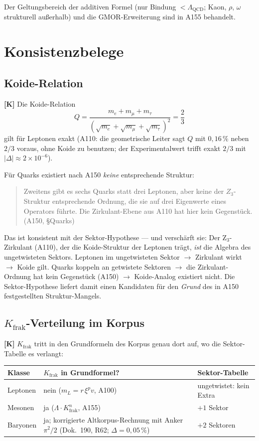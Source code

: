 Der Geltungsbereich der additiven Formel (nur Bindung
$< \Lambda_\text{QCD}$; Kaon, $\rho$, $\omega$ strukturell außerhalb)
und die GMOR-Erweiterung sind in A155 behandelt.

\section{Konsistenzbelege}

\subsection{Koide-Relation}

\textbf{[K]} Die Koide-Relation
\[
  Q = \frac{m_e+m_\mu+m_\tau}{(\sqrt{m_e}+\sqrt{m_\mu}+\sqrt{m_\tau})^2}
  = \frac{2}{3}
\]
gilt für Leptonen exakt (A110: die geometrische Leiter sagt $Q$ mit
$0{,}16\,\%$ neben $2/3$ voraus, ohne Koide zu benutzen; der
Experimentalwert trifft exakt $2/3$ mit $|\Delta| \approx 2\times10^{-6}$).

Für Quarks existiert nach A150 \emph{keine} entsprechende Struktur:
\begin{quote}\small
\glqq Zweitens gibt es sechs Quarks statt drei Leptonen, aber keine der
$Z_3$-Struktur entsprechende Ordnung, die sie auf drei Eigenwerte eines
Operators führte. Die Zirkulant-Ebene aus A110 hat hier kein
Gegenstück.\grqq{} (A150, \S{}Quarks)
\end{quote}

Das ist konsistent mit der Sektor-Hypothese --- und verschärft sie:
Der Z$_3$-Zirkulant (A110), der die Koide-Struktur der Leptonen trägt,
\emph{ist} die Algebra des ungetwisteten Sektors. Leptonen im
ungetwisteten Sektor $\to$ Zirkulant wirkt $\to$ Koide gilt.
Quarks koppeln an getwistete Sektoren $\to$ die Zirkulant-Ordnung hat
\glqq kein Gegenstück\grqq{} (A150) $\to$ Koide-Analog existiert nicht.
Die Sektor-Hypothese liefert damit einen Kandidaten für den \emph{Grund}
des in A150 festgestellten Struktur-Mangels.

\subsection{$K_\text{frak}$-Verteilung im Korpus}

\textbf{[K]} $K_\text{frak}$ tritt in den Grundformeln des Korpus genau
dort auf, wo die Sektor-Tabelle es verlangt:

\begin{center}
\renewcommand{\arraystretch}{1.3}
{\small\begin{tabular}{lll}
\toprule
Klasse & $K_\text{frak}$ in Grundformel? & Sektor-Tabelle \\
\midrule
Leptonen & nein ($m_L = r\,\xi^{p}v$, A100) & ungetwistet: kein Extra \\
Mesonen & ja ($\Lambda\cdot K_\text{frak}^{n}$, A155) & $+1$ Sektor \\
Baryonen & ja; korrigierte Altkorpus-Rechnung mit Anker $\pi^2/2$ (Dok.~190, R62; $\Delta=0{,}05\,\%$) & $+2$ Sektoren \\
\bottomrule
\end{tabular}}
\renewcommand{\arraystretch}{1.0}
\end{center}

